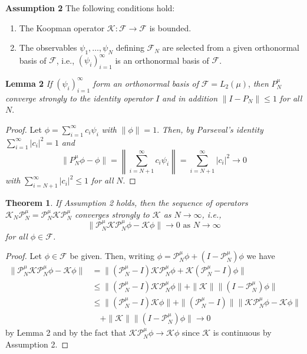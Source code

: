 \documentclass{article}[11]
\newtheorem{theorem}{Theorem}
\begin{document}
	\noindent\textbf{Assumption 2} The following conditions hold:
	\begin{enumerate}
		\item The Koopman operator $\mathcal{K}: \mathcal{F} \to \mathcal{F}$ is bounded.
		\item The observables $\psi_1, \ldots, \psi_N$ defining $\mathcal{F}_N$ are selected from a given orthonormal 
		basis of $\mathcal{F}$, i.e., $(\psi_i)_{i=1}^{\infty}$ is an orthonormal basis of $\mathcal{F}$.
	\end{enumerate}
	\textbf{Lemma 2} \textit{If} $(\psi_i)_{i=1}^\infty$ \textit{form an orthonormal basis of} $\mathcal{F} = L_2(\mu)$, \textit{then} $P_N^\mu$ \textit{converge strongly to the identity operator} $I$ \textit{and in addition} $\|I - P_N\| \leq 1$ \textit{for all} $N$.
	\begin{proof}
		Let $\phi = \sum_{i=1}^\infty c_i \psi_i$ \textit{with} $\|\phi\| = 1$. \textit{Then, by Parseval’s identity} $\sum_{i=1}^\infty |c_i|^2 = 1$ \textit{and}
		\[
		\|P_N^\mu \phi - \phi\| = \left\|\sum_{i=N+1}^\infty c_i \psi_i\right\| = \sum_{i=N+1}^\infty |c_i|^2 \to 0
		\]
		\textit{with} $\sum_{i=N+1}^\infty |c_i|^2 \leq 1$ \textit{for all} $N$.	
	\end{proof}
	\begin{theorem}\label{convergence_large_dic_size}
		If Assumption 2 holds, then the sequence of operators $\mathcal{K}_{N} \mathcal{P}_N^\mu = \mathcal{P}_N^\mu \mathcal{K} \mathcal{P}_N^\mu$ converges strongly to $\mathcal{K}$ \textit{as} $N \to \infty$, i.e.,
		\[
		\|\mathcal{P}_N^\mu \mathcal{K} \mathcal{P}_N^\mu \phi - \mathcal{K}\phi\| \to 0 \text{ as } N\to\infty
		\]
		for all $\phi \in \mathcal{F}$.
	\end{theorem}
	\begin{proof}
		Let $\phi \in \mathcal{F}$ be given. Then, writing $\phi = \mathcal{P}_N^\mu\phi + (I - \mathcal{P}_N^\mu)\phi$ we have
		\begin{align*}
			\|\mathcal{P}_N^\mu \mathcal{K} \mathcal{P}_N^\mu \phi - \mathcal{K}\phi\| &= \|(\mathcal{P}_N^\mu - I)\mathcal{K} \mathcal{P}_N^\mu\phi + \mathcal{K}(\mathcal{P}_N^\mu - I)\phi\| \\
			&\leq \|(\mathcal{P}_N^\mu - I)\mathcal{K}\mathcal{P}_N^\mu\phi\| + \|\mathcal{K}\|\|(I - \mathcal{P}_N^\mu)\phi\| \\
			&\leq \|(\mathcal{P}_N^\mu - I)\mathcal{K}\phi\| + \|(\mathcal{P}_N^\mu - I)\|\|\mathcal{K} \mathcal{P}_N^\mu\phi - \mathcal{K}\phi\| \\
			&\quad + \|\mathcal{K}\|\|(I - \mathcal{P}_N^\mu)\phi\| \to 0
		\end{align*}
		by Lemma 2 and by the fact that $\mathcal{K} \mathcal{P}_N^\mu\phi \to \mathcal{K}\phi$ since $\mathcal{K}$ is continuous by Assumption 2.
	\end{proof}
	
\end{document}

